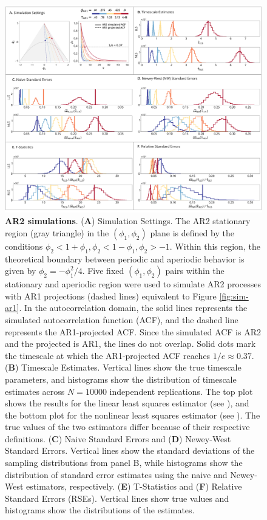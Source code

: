 \documentclass[latex/main.tex]{subfiles}
\begin{document}
\begin{figure}[H]
    \centering
    \includegraphics[width=1\textwidth]{latex/figures/fig02-ar2.png} 
    \caption{
    \textbf{AR2 simulations}.
    (\textbf{A}) Simulation Settings. The AR2 stationary region (gray triangle) in the $(\phi_1, \phi_2)$ plane is defined by the conditions $\phi_2<1+\phi_1, \phi_2<1-\phi_1, \phi_2>-1$. Within this region, the theoretical boundary between periodic and aperiodic behavior is given by $\phi_2 = -\phi_1^2/4$. Five fixed $(\phi_1, \phi_2)$ pairs within the stationary and aperiodic region were used to simulate AR2 processes with AR1 projections (dashed lines) equivalent to Figure \ref{fig:sim-ar1}. In the autocorrelation domain, the solid lines represents the simulated autocorrelation function (ACF), and the dashed line represents the AR1-projected ACF. Since the simulated ACF is AR2 and the projected is AR1, the lines do not overlap. Solid dots mark the timescale at which the AR1-projected ACF reaches $1/e \approx 0.37$.
    (\textbf{B}) Timescale Estimates. Vertical lines show the true timescale parameters, and histograms show the distribution of timescale estimates across $N=10000$ independent replications. The top plot shows the results for the linear least squares estimator (see ), and the bottom plot for the nonlinear least squares estimator (see ). The true values of the two estimators differ because of their respective definitions.
    (\textbf{C}) Naive Standard Errors and (\textbf{D}) Newey-West Standard Errors. Vertical lines show the standard deviations of the sampling distributions from panel B, while histograms show the distribution of standard error estimates using the naive and Newey-West estimators, respectively.
    (\textbf{E}) T-Statistics and (\textbf{F}) Relative Standard Errors (RSEs). Vertical lines show true values and histograms show the distributions of the estimates.
    }
    \label{fig:sim-ar2}
\end{figure}
\end{document}
